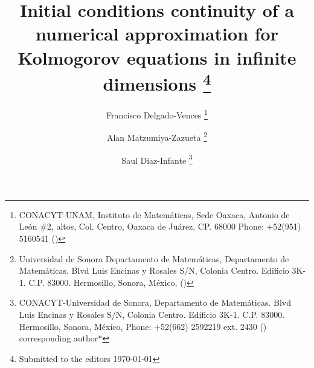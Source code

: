 \title{%
        Initial conditions continuity of a numerical 
        approximation for Kolmogorov equations in infinite dimensions
    \thanks{Submitted to the editors \today}
}
%
\author{
    Francisco Delgado-Vences
    \footnotemark[1]
    \thanks{
    CONACYT-UNAM, 
    Instituto de Matem\'aticas, 
    Sede Oaxaca,
    Antonio de Le\'on \#2, altos, Col. Centro,
    Oaxaca de Ju\'arez, CP. 68000
    Phone: +52(951) 5160541
    ()
    }
%
    \and %
    Alan Matzumiya-Zazueta
   \footnotemark[2]
    \thanks{
    Universidad de Sonora
    Departamento de Matem\'aticas,
    Departamento de Matem\'aticas. 
    Blvd Luis Encinas y Rosales S/N, 
    Colonia Centro. 
    Edificio 3K-1. C.P. 83000.
    Hermosillo, Sonora, M\'exico,
    ()
    }
%
    \and %
    Saul Diaz-Infante
   \footnotemark[3]
    \thanks{%
    CONACYT-Universidad de Sonora, 
    Departamento de Matem\'aticas. 
    Blvd Luis Encinas y Rosales S/N, 
    Colonia Centro. 
    Edificio 3K-1. C.P. 83000.
    Hermosillo, Sonora, M\'exico,
    Phone: +52(662) 2592219 ext. 2430
    ()
    corresponding author*
    }
}
%
\DeclareMathOperator{\sech}{sech}
\ifpdf
\else
\fi
